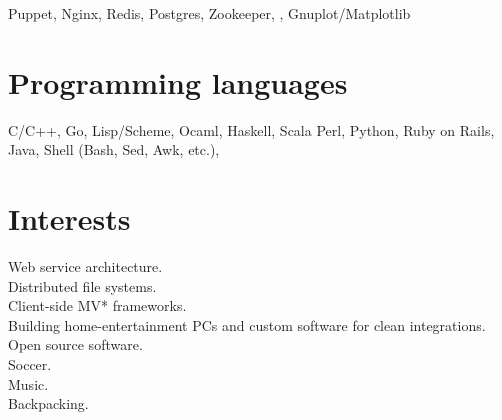 \documentclass[margin,line]{resume}
\begin{document}
\begin{resume}
    Puppet, Nginx, Redis, Postgres, Zookeeper, \LaTeXe, Gnuplot/Matplotlib

    \section{\mysidestyle Programming languages}

    C/C++, Go, Lisp/Scheme, Ocaml, Haskell, Scala
    Perl, Python, Ruby on Rails, Java,
    Shell (Bash, Sed, Awk, etc.),

    \section{\mysidestyle Interests} 

    Web service architecture. \vspace{1mm}\\%
    Distributed file systems. \vspace{1mm}\\%
    Client-side MV* frameworks. \vspace{1mm}\\%
    Building home-entertainment PCs and custom software for clean integrations.\vspace{1mm}\\%
    Open source software. \vspace{1mm}\\%
    Soccer. \vspace{1mm}\\%
    Music. \vspace{1mm}\\%
    Backpacking. \vspace{1mm}\\%





\end{resume}
\end{document}
